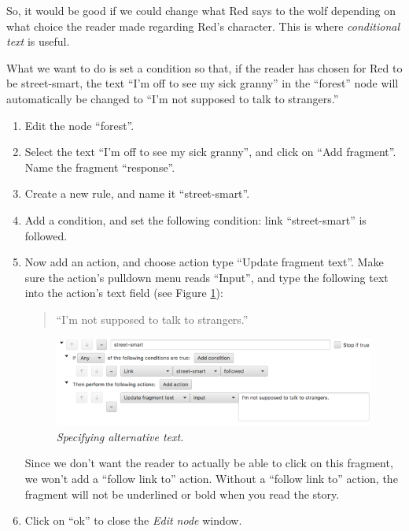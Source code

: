 \documentclass{article}
\begin{document}
So, it would be good if we could change what Red says to the wolf depending on what choice the reader made regarding Red's character. This is where \textit{conditional text} is useful.

What we want to do is set a condition so that, if the reader has chosen for Red to be street-smart, the text ``I'm off to see my sick granny'' in the ``forest'' node will automatically be changed to ``I'm not supposed to talk to strangers.''

\begin{enumerate}
  \item Edit the node ``forest''.
  \item Select the text ``I'm off to see my sick granny'', and click on
  ``Add fragment''. Name the fragment ``response''.
  \item Create a new rule, and name it ``street-smart''.
  \item Add a condition, and set the following condition: link ``street-smart'' is followed.
  \item Now add an action, and choose action type ``Update fragment text''. Make sure the action's pulldown menu reads ``Input'', and type the following text into the action's text field (see Figure \ref{fig:tut2:alttext}):
  \begin{quotation}
  \noindent ``I'm not supposed to talk to strangers.''
  \end{quotation}

\begin{figure}[h]
  \centering
  \includegraphics[width=12cm]{images/hypedyn-tutorial-2-figure-8}
  \caption{\textit{Specifying alternative text.}}
  \label{fig:tut2:alttext}
\end{figure} 

Since we don't want the reader to actually be able to click on this fragment, we won't add a ``follow link to'' action. Without a ``follow link to'' action, the fragment will not be underlined or bold when you read the story.
  \item Click on ``ok'' to close the \textit{Edit node} window.
\end{enumerate}
\end{document}
